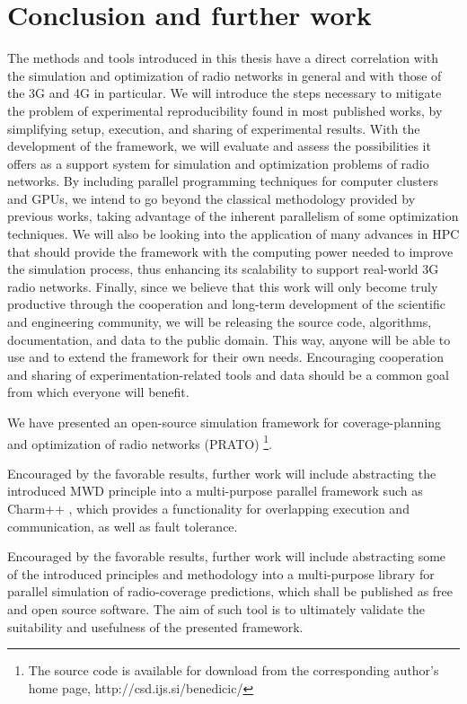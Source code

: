 
\chapter{Conclusion and further work \label{chap:Conclusion}}

The methods and tools introduced in this thesis have a direct correlation
with the simulation and optimization of radio networks in general
and with those of the 3G and 4G in particular. We will introduce the
steps necessary to mitigate the problem of experimental reproducibility
found in most published works, by simplifying setup, execution, and
sharing of experimental results. With the development of the framework,
we will evaluate and assess the possibilities it offers as a support
system for simulation and optimization problems of radio networks.
By including parallel programming techniques for computer clusters
and GPUs, we intend to go beyond the classical methodology provided
by previous works, taking advantage of the inherent parallelism of
some optimization techniques. We will also be looking into the application
of many advances in HPC that should provide the framework with the
computing power needed to improve the simulation process, thus enhancing
its scalability to support real-world 3G radio networks. Finally,
since we believe that this work will only become truly productive
through the cooperation and long-term development of the scientific
and engineering community, we will be releasing the source code, algorithms,
documentation, and data to the public domain. This way, anyone will
be able to use and to extend the framework for their own needs. Encouraging
cooperation and sharing of experimentation-related tools and data
should be a common goal from which everyone will benefit.

We have presented an open-source simulation framework for coverage-planning
and optimization of radio networks (PRATO)%
\footnote{The source code is available for download from the corresponding author's
home page, http://csd.ijs.si/benedicic/%
}.

Encouraged by the favorable results, further work will include abstracting
the introduced MWD principle into a multi-purpose parallel framework
such as Charm++ \cite{Kale-The_Charm_Approach:2013}, which provides
a functionality for overlapping execution and communication, as well
as fault tolerance.

Encouraged by the favorable results, further work will include abstracting
some of the introduced principles and methodology into a multi-purpose
library for parallel simulation of radio-coverage predictions, which
shall be published as free and open source software. The aim of such
tool is to ultimately validate the suitability and usefulness of the
presented framework.

